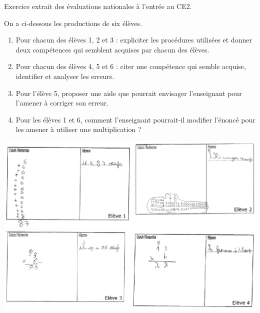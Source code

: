 \begin{exercice}[CRPE 2017 G2]
Exercice extrait des évaluations nationales à l’entrée au CE2.
\begin{center}
\end{center}
On a ci-dessous les productions de six élèves.
\begin{enumerate}
   \item Pour chacun des élèves 1, 2 et 3 : expliciter les procédures utilisées et donner deux compétences qui semblent acquises par chacun des élèves.
   \item Pour chacun des élèves 4, 5 et 6 : citer une compétence qui semble acquise, identifier et analyser les erreurs.
   \item Pour l’élève 5, proposer une aide que pourrait envisager l’enseignant pour l’amener à corriger son erreur.
   \item Pour les élèves 1 et 6, comment l’enseignant pourrait-il modifier l’énoncé pour les amener à utiliser une multiplication ?
\end{enumerate}
\vspace*{-0.4cm}
\begin{center}
   \includegraphics[width=15.2cm]{Nombres_et_calculs_did/Images/Num3_analyse_E12} \\
   \includegraphics[width=15.2cm]{Nombres_et_calculs_did/Images/Num3_analyse_E34} \\

\end{center}
\end{exercice}
